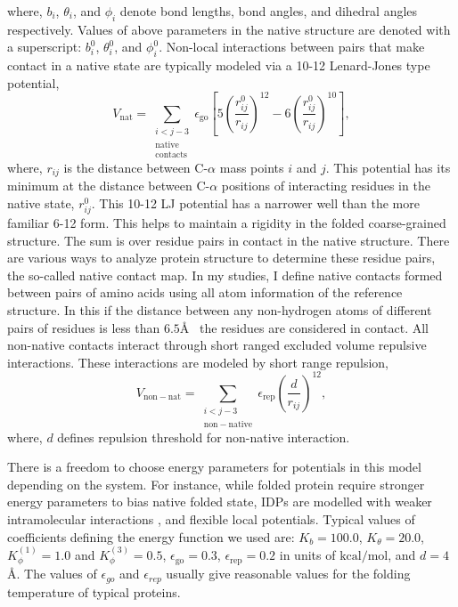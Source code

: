 \documentclass[../talant.diss.submit.tex]{subfiles}
\begin{document}
where, $b_i$, $\theta_i$, and $\phi_i$ denote bond lengths, bond angles, and  dihedral angles
respectively. Values of above parameters in the native structure are denoted with a superscript:
$b_i^0$, $\theta_i^0$, and $\phi_i^0$. Non-local interactions between pairs that make contact
in a native state are typically modeled via a 10-12 Lenard-Jones type potential,
\begin{equation}
  \label{eq:native}
  V_{\mathrm{nat}} =
  \sum_{\substack{i<j-3\\\mathrm{native}\\\mathrm{contacts}}}
  \!\!\!\!\!  \epsilon_{\mathrm{go}} \left[ 5
    \left(\frac{r_{ij}^{0}}{r_{ij}}\right)^{12}  - 6
    \left(\frac{r_{ij}^{0}}{r_{ij}}\right)^{10} \right],
\end{equation}
where, $r_{ij}$ is the distance between C-$\alpha$ mass points $i$ and $j$.
This potential has its minimum at the distance between C-$\alpha$ positions of
interacting residues in the native state, $r_{ij}^0$.  This 10-12 LJ potential
has a narrower well than the more familiar 6-12 form.  This helps to maintain a
rigidity in the folded coarse-grained structure.  The sum is over residue pairs
in contact in the native structure. There are various ways to analyze protein
structure to determine these residue pairs, the so-called native contact map.
In my studies, I define native
contacts formed between pairs of amino acids using all atom information of the
reference structure. In this if the distance between any non-hydrogen atoms of
different pairs of residues is less than $6.5$\AA~ the residues are considered in
contact.
%
%
All non-native contacts interact through short ranged excluded volume repulsive interactions. These interactions are modeled by short range repulsion,
\begin{equation}
  \label{eq:nonnative}
  V_{\mathrm{non-nat}} = \sum_{\substack{i<j-3\\ \mathrm{non-native}}}
  \!\!\!\!  \epsilon_{\mathrm{rep}}
  \left(\frac{d}{r_{ij}}\right)^{12},
\end{equation}
where, $d$ defines repulsion threshold for non-native interaction.

There is a freedom to choose energy parameters for potentials in this model
depending on the system.
For instance, while folded protein require stronger energy parameters
to bias native folded state, IDPs are modelled with weaker intramolecular interactions
\cite{ganguly:11a}, and flexible local potentials\cite{li:11}.  
Typical values of coefficients defining the energy function we used are:
$K_{b} = 100.0$, $K_{\theta} = 20.0$, $K_{\phi}^{(1)} = 1.0$ and $K_{\phi}^{(3)} = 0.5$,
$\epsilon_{\mathrm{go}}=0.3$, $\epsilon_\mathrm{rep} = 0.2$ in  units of $\mathrm{kcal/mol}$,
and $d = 4$\AA. The values of $\epsilon_{go}$ and $\epsilon_{rep}$ usually give reasonable
values for the folding temperature of typical proteins. 
\end{document}
